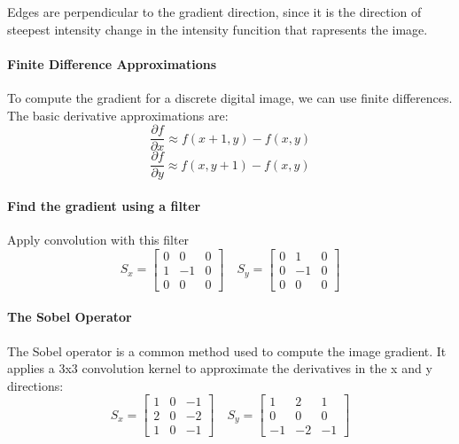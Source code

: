 Edges are perpendicular to the gradient direction, since it is the direction of steepest intensity change in the intensity funcition that rapresents the image.

\paragraph{Finite Difference Approximations}
To compute the gradient for a discrete digital image, we can use finite differences. The basic derivative approximations are:
\[
    \frac{\partial f}{\partial x} \approx f(x+1, y) - f(x, y)
\]
\[
    \frac{\partial f}{\partial y} \approx f(x, y+1) - f(x, y)
\]

\paragraph{Find the gradient using a filter}
Apply convolution with this filter
\[
    S_x = \begin{bmatrix}
        0 & 0  & 0 \\
        1 & -1 & 0 \\
        0 & 0  & 0
    \end{bmatrix}
    \quad
    S_y = \begin{bmatrix}
        0 & 1  & 0 \\
        0 & -1 & 0 \\
        0 & 0  & 0
    \end{bmatrix}
\]

\paragraph{The Sobel Operator}
The Sobel operator is a common method used to compute the image gradient. It applies a 3x3 convolution kernel to approximate the derivatives in the x and y directions:
\[
    S_x = \begin{bmatrix}
        1 & 0 & -1 \\
        2 & 0 & -2 \\
        1 & 0 & -1
    \end{bmatrix}
    \quad
    S_y = \begin{bmatrix}
        1  & 2  & 1  \\
        0  & 0  & 0  \\
        -1 & -2 & -1
    \end{bmatrix}
\]


